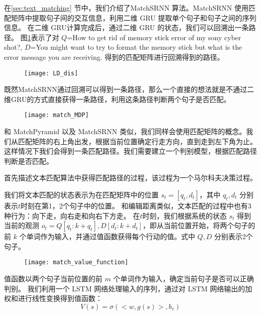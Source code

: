 在\ref{sec:text_matching} 节中，我们介绍了MatchSRNN\cite{Wan2016MatchSRNNMT} 算法。MatchSRNN 使用匹配矩阵中提取句子间的交互信息，利用二维 GRU 提取单个句子和句子之间的序列信息。 在二维 GRU计算完成后，通过二维 GRU 的状态，我们可以回溯出一条路径。
图\ref{fig:LD_dis}表示了对 $Q$=How to get rid of memory stick error of my
sony cyber shot?, $D$=You might want to try to format the memory
stick but what is the error message you are receiving. 得到的匹配矩阵进行回溯得到的路径。

\begin{figure}[H]
    \centering
    \texttt{[image: LD\_dis]}
    \label{fig:LD_dis}
\end{figure}

既然MatchSRNN通过回溯可以得到一条路径，那么一个直接的想法就是不通过二维GRU的方式直接获得一条路径，利用这条路径判断两个句子是否匹配。

\begin{figure}[!htbp]
    \centering
    \texttt{[image: match\_MDP]}
    \label{fig:match_MDP}
\end{figure}

和 MatchPyramid 以及 MatchSRNN 类似，我们同样会使用匹配矩阵的概念。我们从匹配矩阵的右上角出发，根据当前位置确定行走方向，直到走到左下角为止。这样情况下我们会得到一条匹配路径。我们需要建立一个判别模型，根据匹配路径判断是否匹配。

首先描述文本匹配算法中获得匹配路径的过程，该过程为一个马尔科夫决策过程。

我们将文本匹配的状态表示为在匹配矩阵中的位置 $s_t = [q_{t}, d_{t}]$，其中 $q_{t}, d_{t}$ 分别表示$t$时刻在第1，2个句子中的位置。
和编辑距离类似，文本匹配的过程中也有3种行为：向下走，向右走和向右下方走。
在$t$时刻，我们根据系统的状态 $s_t$ 得到当前的观测 $o_t = Q [q_{t}:k+q_{t}], D [d_{t}:k+d_{t}]$，即从当前位置开始，将两个句子的前 $k$ 个单词作为输入，并通过值函数获得每个行动的值。式中 $Q, D$ 分别表示2个句子。

\begin{figure}[!htbp]
    \centering
    \texttt{[image: match\_value\_function]}
    \label{fig:value_function_input}
\end{figure}

值函数以两个句子当前位置的前 $m$ 个单词作为输入，确定当前句子是否可以正确判别。
我们利用一个 LSTM 网络处理输入的序列，通过对 LSTM 网络输出的加权和进行线性变换得到值函数：
$$
V(s) = \sigma(<w, g(s)>, b_v)
$$

